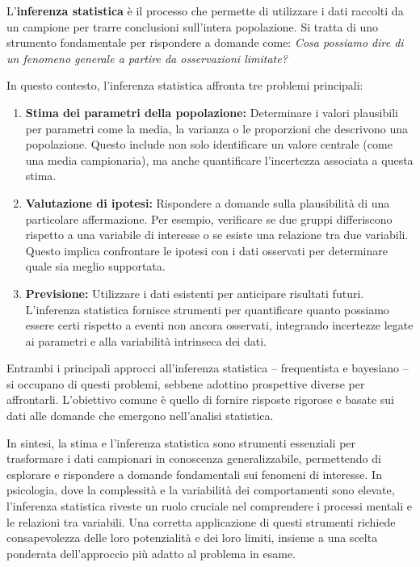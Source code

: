 \documentclass[
  letterpaper,
]{krantz}
\begin{document}
L'\textbf{inferenza statistica} è il processo che permette di utilizzare
i dati raccolti da un campione per trarre conclusioni sull'intera
popolazione. Si tratta di uno strumento fondamentale per rispondere a
domande come: \emph{Cosa possiamo dire di un fenomeno generale a partire
da osservazioni limitate?}

In questo contesto, l'inferenza statistica affronta tre problemi
principali:

\begin{enumerate}
\def\labelenumi{\arabic{enumi}.}
\item
  \textbf{Stima dei parametri della popolazione:} Determinare i valori
  plausibili per parametri come la media, la varianza o le proporzioni
  che descrivono una popolazione. Questo include non solo identificare
  un valore centrale (come una media campionaria), ma anche quantificare
  l'incertezza associata a questa stima.
\item
  \textbf{Valutazione di ipotesi:} Rispondere a domande sulla
  plausibilità di una particolare affermazione. Per esempio, verificare
  se due gruppi differiscono rispetto a una variabile di interesse o se
  esiste una relazione tra due variabili. Questo implica confrontare le
  ipotesi con i dati osservati per determinare quale sia meglio
  supportata.
\item
  \textbf{Previsione:} Utilizzare i dati esistenti per anticipare
  risultati futuri. L'inferenza statistica fornisce strumenti per
  quantificare quanto possiamo essere certi rispetto a eventi non ancora
  osservati, integrando incertezze legate ai parametri e alla
  variabilità intrinseca dei dati.
\end{enumerate}

Entrambi i principali approcci all'inferenza statistica -- frequentista
e bayesiano -- si occupano di questi problemi, sebbene adottino
prospettive diverse per affrontarli. L'obiettivo comune è quello di
fornire risposte rigorose e basate sui dati alle domande che emergono
nell'analisi statistica.

In sintesi, la stima e l'inferenza statistica sono strumenti essenziali
per trasformare i dati campionari in conoscenza generalizzabile,
permettendo di esplorare e rispondere a domande fondamentali sui
fenomeni di interesse. In psicologia, dove la complessità e la
variabilità dei comportamenti sono elevate, l'inferenza statistica
riveste un ruolo cruciale nel comprendere i processi mentali e le
relazioni tra variabili. Una corretta applicazione di questi strumenti
richiede consapevolezza delle loro potenzialità e dei loro limiti,
insieme a una scelta ponderata dell'approccio più adatto al problema in
esame.
\end{document}
